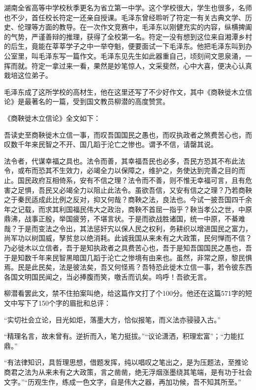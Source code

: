 \documentclass[../../dazhuan.tex]{subfiles}
\begin{document}
湖南全省高等中学校秋季更名为省立第一中学。这个学校很大，学生也很多，名师也不少，首任校长符定一还亲自授课。毛泽东曾经聆听了符定一有关古典文学、历史、伦理等方面的教导。在一次作文竞赛中，毛泽东以刚健充实的内容，纵横捭阖的气势，严谨善辩的推理，获得了全校第一名。符定一没有想到这位来自湘潭乡村的后生，竟能在莘莘学子之中一举夺魁，便要面试一下毛泽东。他把毛泽东叫到办公室里，叫毛泽东写一篇作文。毛泽东见先生如此器重自己，顷刻间文思泉涌，一挥而就。符定一拿过来一看，果然是妙笔惊人，文采斐然，心中大喜，便决心认真栽培这位弟子。

毛泽东成了这所学校的高材生，他在这里还写了不少好作文，其中《商鞅徙木立信论》是最著名的一篇，受到国文教员柳潜的高度赞赏。

《商鞅徙木立信论》全文如下：
\begin{xquote}

吾读史至商鞅徙木立信一事，而叹吾国国民之愚也，而叹执政者之煞费苦心也，而叹数千年来民智之不开、国几蹈于沦亡之惨也。谓予不信，请罄其说。

法令者，代谋幸福之具也。法令而善，其幸福吾民也必多，吾民方恐其不布此法令，或布而恐其不生效力，必竭全力以保障之，维护之，务使达到完善之目的而止。国民政府互相倚系，安有不信之理？法令而不善，则不惟无幸福可言，且有危害之足惧，吾民又必竭全力以阻止此法令。虽欲吾信，又安有信之之理？乃若商鞅之于秦民适成此比例之反对，抑又何哉？商鞅之法，良法也。今试一披吾国四千余年之记载，而求其利国福民伟大之政治，商鞅不首屈一指乎？鞅当孝公之世，中原鼎沸，战事正殷，举国疲劳，不堪言状。于是而欲战胜诸国，统一中原，不綦难哉？于是而变法之令出，其法惩奸宄以保人民之权利，务耕织以增进国民之富力，尚军功以树国威，孥贫怠以绝消耗。此诚我国从来未有之大政策，民何惮而不信？乃必徙木以立信者，吾于是知执政者之具费苦心也，吾于是知吾国国民之愚也，吾于是知数千年来民智黑暗国几蹈于沦亡之惨境有由来也。虽然，非常之原，黎民惧焉。民是此民矣，法是彼法矣，吾又何怪焉？吾特恐此徙木立信一事，若令彼东西各国文明国民闻之，当必捧腹而笑，噭舌而讥矣。呜呼！吾欲无言。
\end{xquote}

柳潜看罢此文，禁不住拍案叫绝，给这篇作文打了个100分。他还在这篇571字的短文中写下了150个字的眉批和总评：

“实切社会立论，目光如炬，落墨大方，恰似报笔，而义法亦骎骎入古。”

“精理名言，故未曾有。逆折而入，笔力挺拔。”“议论潇洒，积理宏富”；“力能扛鼎。”

“有法律知识，具哲理思想，借题发挥，纯以唱叹之笔出之，是为压题法，至推论商君之法为从来未有之大政策，言之凿凿，绝无浮烟涨墨绕其笔端，是有功于社会文字。”“历观生作，练成一色文字，自是伟大之器，再加功候，吾不知其所至。”
\end{document}
